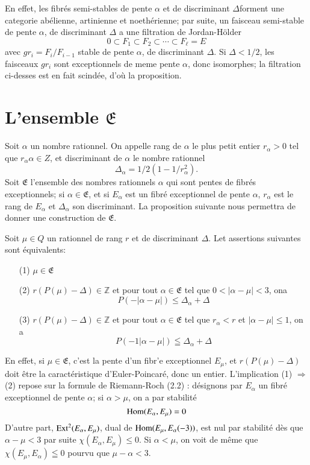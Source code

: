 En effet, les fibr\'es semi-stables de pente $\alpha$ et de
discriminant $\Delta$\pageoriginale forment une categorie ab\'elienne,
artinienne et noeth\'erienne; par suite, un faisceau semi-stable de
pente $\alpha$, de discriminant $\Delta$ a une filtration de
Jordan-H\"older 
$$
0\subset F_{1}\subset F_{2}\subset\cdots\subset F_{\ell}=E
$$
avec $gr_{i}=F_{i}/F_{i-1}$ stable de pente $\alpha$, de discriminant
$\Delta$. Si $\Delta<1/2$, les faisceaux $gr_{i}$ sont exceptionnels
de meme pente $\alpha$, donc isomorphes; la filtration ci-desses est
en fait scind\'ee, d'o\`u la proposition. 

\section{L'ensemble \texorpdfstring{$\mathfrak{E}$}{E}}\label{chap5-sec5}

Soit $\alpha$ un nombre rationnel. On appelle rang de $\alpha$ le plus
petit entier $r_{\alpha}>0$ tel que $r_{\alpha}\alpha\in Z$, et
discriminant de $\alpha$ le nombre rationnel
$$
\Delta_{\alpha}=1/2(1-1/r^{2}_{\alpha}).
$$
Soit $\mathfrak{E}$ l'ensemble des nombres rationnels $\alpha$ qui
sont pentes de fibr\'es exceptionnels; si $\alpha\in \mathfrak{E}$, et
si $E_{\alpha}$ est un fibr\'e exceptionnel de pente $\alpha$,
$r_{\alpha}$ est le rang de $E_{\alpha}$ et $\Delta_{\alpha}$ son
discriminant. La proposition suivante nous permettra de donner une
construction de $\mathfrak{E}$. 

\begin{proposition}\label{chap5-prop4}
Soit $\mu\in Q$ un rationnel de rang $r$ et de discriminant
$\Delta$. Let assertions suivantes sont \'equivalents: 
\begin{itemize}
\item[\rm(1)] $\mu\in\mathfrak{E}$

\item[\rm(2)] $r(P(\mu)-\Delta)\in \mathbb{Z}$ et pour tout
$\alpha\in \mathfrak{E}$ tel que $0<|\alpha-\mu|<3$, on\pageoriginale a
$$
P(-|\alpha-\mu|)\leq \Delta_{\alpha}+\Delta
$$

\item[\rm(3)] $r(P(\mu)-\Delta)\in \mathbb{Z}$ et pour tout
$\alpha\in \mathfrak{E}$ tel que $r_{\alpha}<r$ et $|\alpha-\mu|\leq
1$, on a
$$
P(-1|\alpha-\mu|)\leqq \Delta_{\alpha}+\Delta
$$
\end{itemize}
\end{proposition}

En effet, si $\mu\in \mathfrak{E}$, c'est la pente d'un fibr'e
exceptionnel $E_{\mu}$, et $r(P(\mu)-\Delta)$ doit \^etre la
caract\'eristique d'Euler-Poincar\'e, donc un entier. L'implication
(1) $\Rightarrow$ (2) repose sur la formule de Riemann-Roch (2.2) :
d\'esignons par $E_{\alpha}$ un fibr\'e exceptionnel de pente
$\alpha$; si $\alpha>\mu$, on a par stabilit\'e
$$
\operatorname{Hom}(E_{\alpha},E_{\mu})=0
$$
D'autre part, $\operatorname{Ext}^{2}(E_{\alpha},E_{\mu})$, dual de
$\operatorname{Hom}(E_{\mu},E_{\alpha}(-3))$, est nul par stabilit\'e d\`es que
$\alpha-\mu<3$ par suite $\chi(E_{\alpha},E_{\mu})\leq 0$. Si
$\alpha<\mu$, on voit de m\^eme que $\chi(E_{\mu},E_{\alpha})\leqq 0$
pourvu que $\mu-\alpha<3$. 

